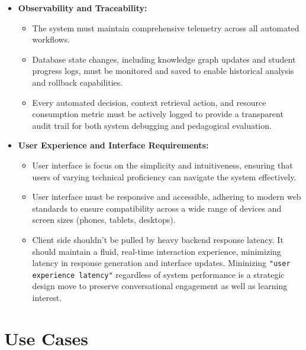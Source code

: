 \begin{itemize}
    \item \textbf{Observability and Traceability:}
    \begin{itemize}
        \item The system must maintain comprehensive telemetry across all automated workflows.
        \item Database state changes, including knowledge graph updates and student progress logs, must be monitored and saved to enable historical analysis and rollback capabilities.        
        \item Every automated decision, context retrieval action, and resource consumption metric must be actively logged to provide a transparent audit trail for both system debugging and pedagogical evaluation.
    \end{itemize}
    \item \textbf{User Experience and Interface Requirements:}
    \begin{itemize}
        \item User interface is focus on the simplicity and intuitiveness, ensuring that users of varying technical proficiency can navigate the system effectively.
        \item User interface must be responsive and accessible, adhering to modern web standards to ensure compatibility across a wide range of devices and screen sizes (phones, tablets, desktops).
        \item Client side shouldn't be pulled by heavy backend response latency. It should maintain a fluid, real-time interaction experience, minimizing latency 
        in response generation and interface updates. Mininizing \texttt{"user experience latency"} regardless of system performance 
        is a strategic design move to preserve conversational engagement as well as learning interest.
    \end{itemize}

\end{itemize}




\section{Use Cases}\label{sec:usecase}

